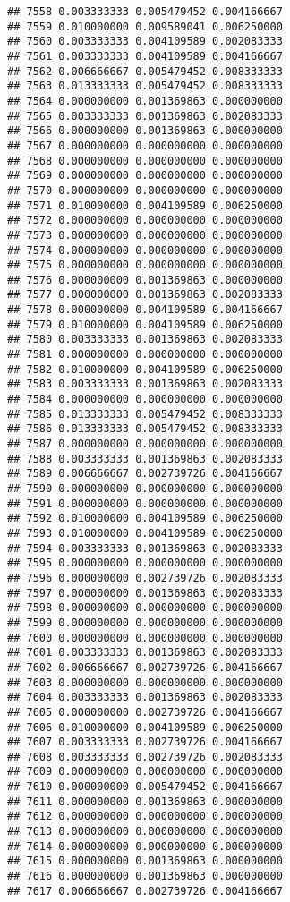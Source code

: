 \documentclass[
]{article}
\begin{document}
\begin{verbatim}
## 7558 0.003333333 0.005479452 0.004166667
## 7559 0.010000000 0.009589041 0.006250000
## 7560 0.003333333 0.004109589 0.002083333
## 7561 0.003333333 0.004109589 0.004166667
## 7562 0.006666667 0.005479452 0.008333333
## 7563 0.013333333 0.005479452 0.008333333
## 7564 0.000000000 0.001369863 0.000000000
## 7565 0.003333333 0.001369863 0.002083333
## 7566 0.000000000 0.001369863 0.000000000
## 7567 0.000000000 0.000000000 0.000000000
## 7568 0.000000000 0.000000000 0.000000000
## 7569 0.000000000 0.000000000 0.000000000
## 7570 0.000000000 0.000000000 0.000000000
## 7571 0.010000000 0.004109589 0.006250000
## 7572 0.000000000 0.000000000 0.000000000
## 7573 0.000000000 0.000000000 0.000000000
## 7574 0.000000000 0.000000000 0.000000000
## 7575 0.000000000 0.000000000 0.000000000
## 7576 0.000000000 0.001369863 0.000000000
## 7577 0.000000000 0.001369863 0.002083333
## 7578 0.000000000 0.004109589 0.004166667
## 7579 0.010000000 0.004109589 0.006250000
## 7580 0.003333333 0.001369863 0.002083333
## 7581 0.000000000 0.000000000 0.000000000
## 7582 0.010000000 0.004109589 0.006250000
## 7583 0.003333333 0.001369863 0.002083333
## 7584 0.000000000 0.000000000 0.000000000
## 7585 0.013333333 0.005479452 0.008333333
## 7586 0.013333333 0.005479452 0.008333333
## 7587 0.000000000 0.000000000 0.000000000
## 7588 0.003333333 0.001369863 0.002083333
## 7589 0.006666667 0.002739726 0.004166667
## 7590 0.000000000 0.000000000 0.000000000
## 7591 0.000000000 0.000000000 0.000000000
## 7592 0.010000000 0.004109589 0.006250000
## 7593 0.010000000 0.004109589 0.006250000
## 7594 0.003333333 0.001369863 0.002083333
## 7595 0.000000000 0.000000000 0.000000000
## 7596 0.000000000 0.002739726 0.002083333
## 7597 0.000000000 0.001369863 0.002083333
## 7598 0.000000000 0.000000000 0.000000000
## 7599 0.000000000 0.000000000 0.000000000
## 7600 0.000000000 0.000000000 0.000000000
## 7601 0.003333333 0.001369863 0.002083333
## 7602 0.006666667 0.002739726 0.004166667
## 7603 0.000000000 0.000000000 0.000000000
## 7604 0.003333333 0.001369863 0.002083333
## 7605 0.000000000 0.002739726 0.004166667
## 7606 0.010000000 0.004109589 0.006250000
## 7607 0.003333333 0.002739726 0.004166667
## 7608 0.003333333 0.002739726 0.002083333
## 7609 0.000000000 0.000000000 0.000000000
## 7610 0.000000000 0.005479452 0.004166667
## 7611 0.000000000 0.001369863 0.000000000
## 7612 0.000000000 0.000000000 0.000000000
## 7613 0.000000000 0.000000000 0.000000000
## 7614 0.000000000 0.000000000 0.000000000
## 7615 0.000000000 0.001369863 0.000000000
## 7616 0.000000000 0.001369863 0.000000000
## 7617 0.006666667 0.002739726 0.004166667

\end{verbatim}
\end{document}
